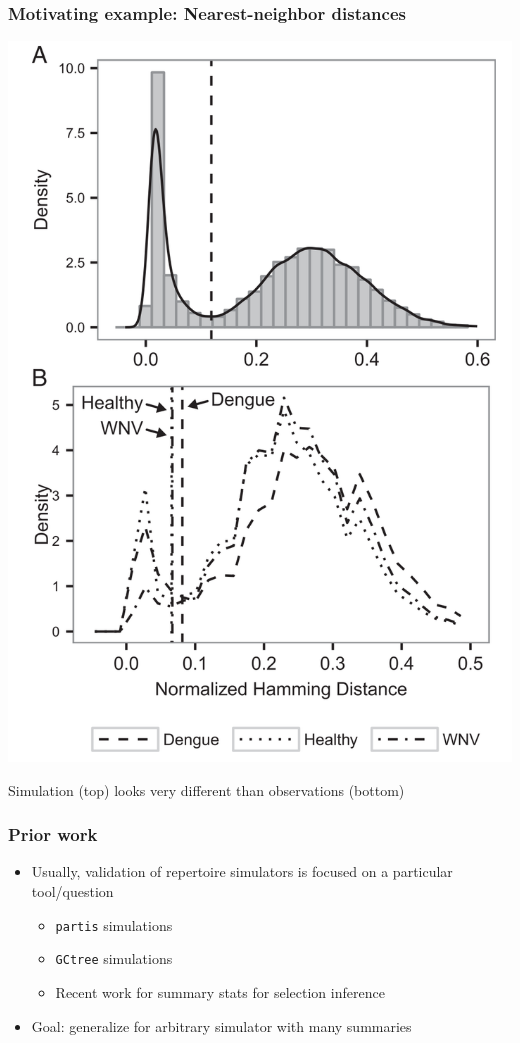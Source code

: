 \documentclass[mathserif,compress]{beamer}
\renewcommand\;{\,}
\begin{document}
\begin{frame}

\begin{center}\frametitle{Motivating example: Nearest-neighbor distances}
\includegraphics[width=0.4\linewidth]{Images/Dengue.png}
\end{center}
Simulation (top) looks very different than observations (bottom)
\end{frame}

\begin{frame}\frametitle{Prior work}
\begin{itemize}
\item
Usually, validation of repertoire simulators is focused on a particular tool/question
\medskip
\begin{itemize}
\item
 \texttt{partis} simulations
 \bigskip
 \item
 \texttt{GCtree} simulations
 \bigskip
 \item
 Recent work for summary stats for selection inference
  \end{itemize}
\bigskip
\item Goal: generalize for arbitrary simulator with many summaries
\end{itemize}
\end{frame}
\end{document}
